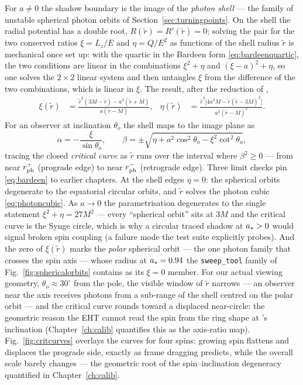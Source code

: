 For $a \neq 0$ the shadow boundary is the image of the \emph{photon
shell} — the family of unstable spherical photon orbits of
Section~\ref{sec:turningpoints}. On the shell the radial potential has a
double root, $R(\tilde r) = R'(\tilde r) = 0$; solving the pair for the
two conserved ratios $\xi = L_z/E$ and $\eta = Q/E^2$ as functions of
the shell radius $\tilde r$ is mechanical once set up: with the quartic
in the Bardeen form \eqref{eq:bardeenquartic}, the two conditions are
linear in the combinations $\xi^2 + \eta$ and $(\xi - a)^2 + \eta$, so
one solves the $2\times2$ linear system and then untangles $\xi$ from
the difference of the two combinations, which is linear in $\xi$. The
result, after the reduction of \citet{Bardeen1973},
\begin{align}
\xi(\tilde r) &= \frac{\tilde r^2(3M-\tilde r) - a^2(\tilde r+M)}
{a(\tilde r-M)},
&
\eta(\tilde r) &= \frac{\tilde r^3\bigl[4a^2M -
\tilde r(\tilde r-3M)^2\bigr]}{a^2(\tilde r-M)^2}.
\label{eq:bardeen}
\end{align}
For an observer at inclination $\theta_o$ the shell maps to the image
plane as
\begin{equation}
\alpha = -\frac{\xi}{\sin\theta_o}, \qquad
\beta = \pm\sqrt{\eta + a^2\cos^2\theta_o - \xi^2\cot^2\theta_o},
\label{eq:criticalimage}
\end{equation}
tracing the closed \emph{critical curve} as $\tilde r$ runs over the
interval where $\beta^2 \geq 0$ — from near $r_{\rm ph}^+$ (prograde
edge) to near $r_{\rm ph}^-$ (retrograde edge). Three limit checks pin
\eqref{eq:bardeen} to earlier chapters. At the shell edges $\eta = 0$:
the spherical orbits degenerate to the equatorial circular orbits, and
$\tilde r$ solves the photon cubic \eqref{eq:photoncubic}. As
$a \to 0$ the parametrisation degenerates to the single statement
$\xi^2 + \eta = 27M^2$ — every ``spherical orbit'' sits at $3M$ and
the critical curve is the Synge circle, which is why a circular traced
shadow at $a_* > 0$ would signal broken spin coupling (a failure
mode the test suite explicitly probes). And the zero of $\xi(\tilde r)$
marks the \emph{polar} spherical orbit — the one photon family that
crosses the spin axis — whose radius at $a_* = 0.94$ the
\texttt{sweep\_tool} family of Fig.~\ref{fig:sphericalorbits} contains
as its $\xi = 0$ member. For our actual \sgra{} viewing geometry,
$\theta_o \approx 30^\circ$ from the pole, the visible window of
$\tilde r$ narrows — an observer near the axis receives photons from
a sub-range of the shell centred on the polar orbit — and the critical
curve rounds toward a displaced near-circle: the geometric reason the
EHT cannot read the spin from the ring shape at \sgra{}'s inclination
(Chapter~\ref{ch:calib} quantifies this as the axis-ratio map). Fig.~\ref{fig:critcurves}
overlays the curves for four spins: growing spin flattens and displaces
the prograde side, exactly as frame dragging predicts, while the overall
scale barely changes — the geometric root of the spin--inclination
degeneracy quantified in Chapter~\ref{ch:calib}.

